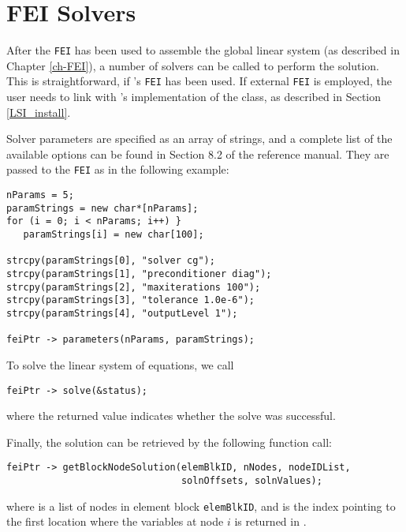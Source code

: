 \section{FEI Solvers}
\label{LSI_solvers}

After the {\tt FEI} has been used to assemble the global linear system
(as described in Chapter \ref{ch-FEI}), a number of \hypre{} solvers
can be called to perform the solution.
This is straightforward, if \hypre's {\tt FEI} has been used.
If external {\tt FEI} is employed, the user needs to link with \hypre's
implementation of the  class, as described
in Section \ref{LSI_install}.

Solver parameters are specified as an array of strings, and a complete
list of the available options can be found in Section 8.2 of the reference
manual.
They are passed to the {\tt FEI} as in the following example:
\begin{display}
\begin{verbatim}
nParams = 5;
paramStrings = new char*[nParams];
for (i = 0; i < nParams; i++) }
   paramStrings[i] = new char[100];

strcpy(paramStrings[0], "solver cg");
strcpy(paramStrings[1], "preconditioner diag");
strcpy(paramStrings[2], "maxiterations 100");
strcpy(paramStrings[3], "tolerance 1.0e-6");
strcpy(paramStrings[4], "outputLevel 1");

feiPtr -> parameters(nParams, paramStrings);
\end{verbatim}
\end{display}
To solve the linear system of equations, we call
\begin{display}
\begin{verbatim}
feiPtr -> solve(&status);
\end{verbatim}
\end{display}
where the returned value  indicates whether the solve was successful.

Finally, the solution can be retrieved by the following function call:
\begin{display}
\begin{verbatim}
feiPtr -> getBlockNodeSolution(elemBlkID, nNodes, nodeIDList,
                               solnOffsets, solnValues);
\end{verbatim}
\end{display}
where  is a list of nodes in element block {\tt elemBlkID}, and
 is the index pointing to the first location
where the variables at node $i$ is returned in .

